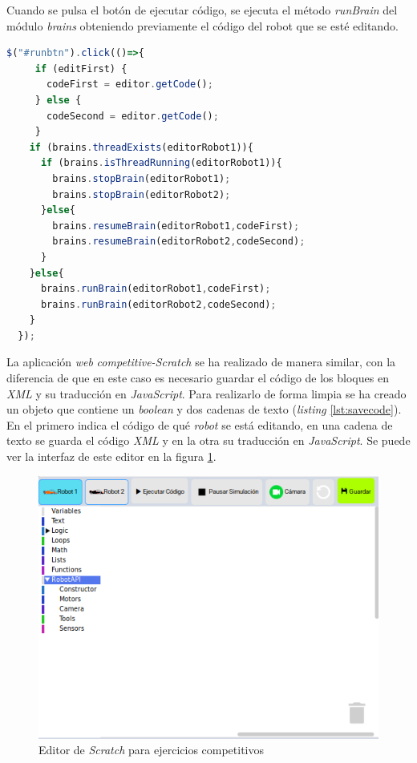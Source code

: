 Cuando se pulsa el botón de ejecutar código, se ejecuta el método \textit{runBrain} del módulo \textit{brains} obteniendo previamente el código del robot que se esté editando.
\begin{lstlisting}[language=javascript]
  $("#runbtn").click(()=>{
     if (editFirst) {
       codeFirst = editor.getCode();
     } else {
       codeSecond = editor.getCode();
     }
    if (brains.threadExists(editorRobot1)){
      if (brains.isThreadRunning(editorRobot1)){
        brains.stopBrain(editorRobot1);
        brains.stopBrain(editorRobot2);
      }else{
        brains.resumeBrain(editorRobot1,codeFirst);
        brains.resumeBrain(editorRobot2,codeSecond);
      }
    }else{
      brains.runBrain(editorRobot1,codeFirst);
      brains.runBrain(editorRobot2,codeSecond);
    }
  });
\end{lstlisting}


La aplicación \textit{web} \textit{competitive-Scratch} se ha realizado de  manera similar, con la diferencia de que en este caso es necesario guardar el código de los bloques en \textit{XML} y su traducción en \textit{JavaScript}. Para realizarlo de forma limpia se ha creado un objeto que contiene un \textit{boolean} y dos cadenas de texto (\textit{listing} \ref{lst:savecode}). En el primero indica el código de qué \textit{robot} se está editando, en una cadena de texto se guarda el código \textit{XML} y en la otra su traducción en \textit{JavaScript}. Se puede ver la interfaz de este editor en la figura \ref{fig:scratch_competitivo}.
    \begin{figure}[H]
        \centering            
        \includegraphics[scale=0.8]{img/competitivoEditorScratch.png}
        \caption{Editor de \textit{Scratch} para ejercicios competitivos}
        \label{fig:scratch_competitivo}
    \end{figure}


